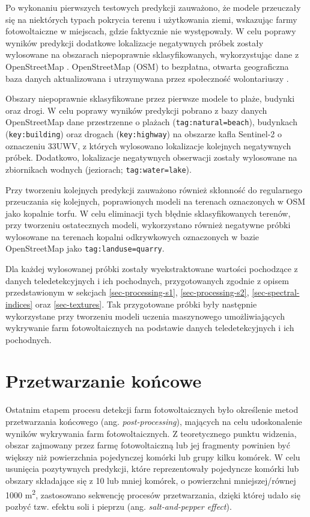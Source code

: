 \documentclass{amuthesis}
\begin{document}
Po wykonaniu pierwszych testowych predykcji zauważono, że modele
przeuczały się na niektórych typach pokrycia terenu i użytkowania ziemi,
wskazując farmy fotowoltaiczne w miejscach, gdzie faktycznie nie
występowały. W celu poprawy wyników predykcji dodatkowe lokalizacje
negatywnych próbek zostały wylosowane na obszarach niepoprawnie
sklasyfikowanych, wykorzystując dane z OpenStreetMap
\autocite{OpenStreetMap}. OpenStreetMap (OSM) to bezpłatna, otwarta
geograficzna baza danych aktualizowana i utrzymywana przez społeczność
wolontariuszy \autocite{bennett_2010_openstreetmap}.

Obszary niepoprawnie sklasyfikowane przez pierwsze modele to plaże,
budynki oraz drogi. W celu poprawy wyników predykcji pobrano z bazy
danych OpenStreetMap dane przestrzenne o plażach
(\texttt{tag:natural=beach}), budynkach (\texttt{key:building}) oraz
drogach (\texttt{key:highway}) na obszarze kafla Sentinel-2 o oznaczeniu
33UWV, z których wylosowano lokalizacje kolejnych negatywnych próbek.
Dodatkowo, lokalizacje negatywnych obserwacji zostały wylosowane na
zbiornikach wodnych (jeziorach; \texttt{tag:water=lake}).

Przy tworzeniu kolejnych predykcji zauważono również skłonność do
regularnego przeuczania się kolejnych, poprawionych modeli na terenach
oznaczonych w OSM jako kopalnie torfu. W celu eliminacji tych błędnie
sklasyfikowanych terenów, przy tworzeniu ostatecznych modeli,
wykorzystano również negatywne próbki wylosowane na terenach kopalni
odkrywkowych oznaczonych w bazie OpenStreetMap jako
\texttt{tag:landuse=quarry}.

Dla każdej wylosowanej próbki zostały wyekstraktowane wartości
pochodzące z danych teledetekcyjnych i ich pochodnych, przygotowanych
zgodnie z opisem przedstawionym w sekcjach \ref{sec-processing-s1},
\ref{sec-processing-s2}, \ref{sec-spectral-indices} oraz
\ref{sec-textures}. Tak przygotowane próbki były następnie wykorzystane
przy tworzeniu modeli uczenia maszynowego umożliwiających wykrywanie
farm fotowoltaicznych na podstawie danych teledetekcyjnych i ich
pochodnych.

\hypertarget{sec-post-processing}{%
\section{Przetwarzanie końcowe}\label{sec-post-processing}}

Ostatnim etapem procesu detekcji farm fotowoltaicznych było określenie
metod przetwarzania końcowego (ang. \emph{post-processing}), mających na
celu udoskonalenie wyników wykrywania farm fotowoltaicznych. Z
teoretycznego punktu widzenia, obszar zajmowany przez farmę
fotowoltaiczną lub jej fragmenty powinien być większy niż powierzchnia
pojedynczej komórki lub grupy kilku komórek. W celu usunięcia
pozytywnych predykcji, które reprezentowały pojedyncze komórki lub
obszary składające się z 10 lub mniej komórek, o powierzchni
mniejszej/równej 1000 m\textsuperscript{2}, zastosowano sekwencję
procesów przetwarzania, dzięki której udało się pozbyć tzw. efektu soli
i pieprzu (ang. \emph{salt-and-pepper effect}).
\end{document}
